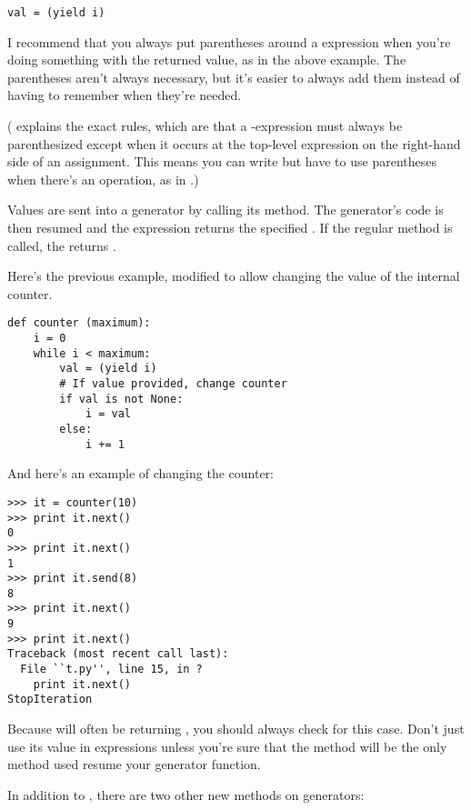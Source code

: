 \documentclass{howto}
\begin{document}
\begin{verbatim}
val = (yield i)
\end{verbatim}

I recommend that you always put parentheses around a 
expression when you're doing something with the returned value, as in
the above example.  The parentheses aren't always necessary, but it's
easier to always add them instead of having to remember when they're
needed.

( explains the exact rules, which are that a
-expression must always be parenthesized except when it
occurs at the top-level expression on the right-hand side of an
assignment.  This means you can write  but have to
use parentheses when there's an operation, as in .)

Values are sent into a generator by calling its
 method.  The generator's code is then
resumed and the  expression returns the specified
.  If the regular  method is called, the
 returns .

Here's the previous example, modified to allow changing the value of
the internal counter.

\begin{verbatim}
def counter (maximum):
    i = 0
    while i < maximum:
        val = (yield i)
        # If value provided, change counter
        if val is not None:
            i = val
        else:
            i += 1
\end{verbatim}

And here's an example of changing the counter:

\begin{verbatim}
>>> it = counter(10)
>>> print it.next()
0
>>> print it.next()
1
>>> print it.send(8)
8
>>> print it.next()
9
>>> print it.next()
Traceback (most recent call last):
  File ``t.py'', line 15, in ?
    print it.next()
StopIteration
\end{verbatim}

Because  will often be returning , you
should always check for this case.  Don't just use its value in
expressions unless you're sure that the  method
will be the only method used resume your generator function.

In addition to , there are two other new methods on
generators:
\end{document}
